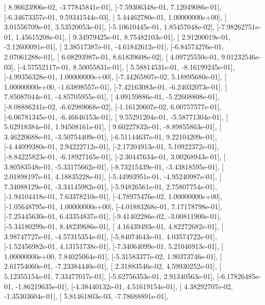 \documentclass{article}
\begin{document}
       [ 8.96623906e-02, -3.77845841e-01],
       [-7.59306348e-01,  7.12049086e-01],
       [-6.34673357e-01,  9.59341544e-03],
       [ 5.44462780e-01,  1.00000000e+00],
       [ 3.01556709e-01,  3.53520053e-01],
       [-5.10610445e-01,  1.85457048e-02],
       [-7.98262751e-01,  1.45615208e-01],
       [ 9.34979425e-01,  8.75482103e-01],
       [ 2.91200019e-01, -2.12600091e-01],
       [ 2.38517387e-01, -4.61842612e-01],
       [-6.84574276e-01,  2.07061288e-01],
       [ 6.08293987e-01,  8.61839608e-02],
       [ 4.09725550e-01,  9.01232546e-03],
       [-4.57552117e-01,  8.50055831e-01],
       [ 5.58814531e-01, -8.16199245e-01],
       [-4.99356328e-01,  1.00000000e+00],
       [-7.44265807e-02,  5.18895680e-01],
       [ 1.00000000e+00, -1.63898557e-01],
       [-7.42163083e-01, -6.24032073e-01],
       [ 7.85087044e-01, -4.85705955e-01],
       [ 4.09159886e-01, -5.22608808e-01],
       [-8.08886241e-02, -6.62989068e-02],
       [-1.16120607e-02,  6.00757577e-01],
       [-6.06781345e-01, -6.46646153e-01],
       [ 9.55291204e-01, -5.58771304e-01],
       [ 5.62918384e-01,  1.94508161e-01],
       [ 9.60227832e-01, -8.89855863e-01],
       [ 3.46220688e-01, -3.50754409e-01],
       [-6.51144637e-01,  9.22104209e-01],
       [-4.44099380e-01,  2.94222712e-01],
       [-2.17204913e-01,  5.10922372e-01],
       [-8.84225823e-01, -6.18927165e-01],
       [-2.30447634e-01,  3.00268943e-01],
       [ 3.80583548e-01, -5.33175662e-01],
       [-8.73215439e-01, -3.43818595e-01],
       [ 2.01898197e-01,  4.18835228e-01],
       [-5.44993951e-01, -4.95240987e-01],
       [ 7.34088129e-01, -3.34145982e-01],
       [-5.94826561e-01,  2.75807754e-01],
       [-1.94104418e-01,  7.63378210e-01],
       [-4.78975476e-02,  1.00000000e+00],
       [-1.05648795e-01,  1.00000000e+00],
       [-4.01883268e-01,  7.17178798e-01],
       [-7.25445630e-01,  6.43354837e-01],
       [-9.41402286e-02, -3.00811900e-01],
       [-5.34180299e-01,  8.48239686e-01],
       [ 4.16439493e-01,  4.82272682e-01],
       [ 3.98747727e-01, -4.57315354e-01],
       [-5.84074643e-01,  4.03574722e-01],
       [-1.52456982e-01,  4.13151738e-01],
       [-7.34064099e-01,  5.21046913e-01],
       [ 1.00000000e+00,  7.84025064e-01],
       [-5.31583377e-02,  1.90373746e-01],
       [ 2.61754060e-01, -7.23384440e-01],
       [ 2.31883546e-02,  4.59930252e-01],
       [ 5.12355154e-01,  7.33477017e-01],
       [-5.62756353e-01,  2.91340563e-01],
       [-6.17826485e-01, -1.86219635e-01],
       [-4.38440132e-01,  4.51619154e-01],
       [ 4.38292707e-02, -1.35303604e-01],
       [ 5.81461803e-03, -7.78688891e-01],
\end{document}
